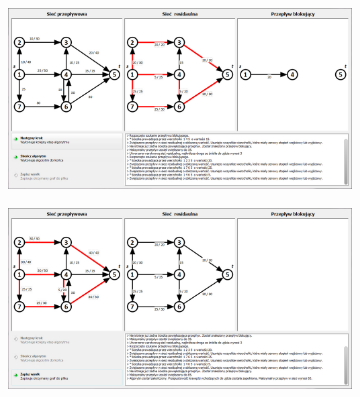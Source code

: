 \begin{appendices}
\begin{figure}
\begin{subfigure}{\textwidth}
 		\end{subfigure}\par\bigskip
 		\begin{subfigure}{\textwidth}
 			\includegraphics[width=0.9\linewidth]{./img/dinic08.jpg}
 		\end{subfigure}\par\bigskip
 		\begin{subfigure}{\textwidth}
 			\includegraphics[width=0.9\linewidth]{./img/dinic09.jpg}
 		\end{subfigure}
 	\end{figure}

\end{appendices}
